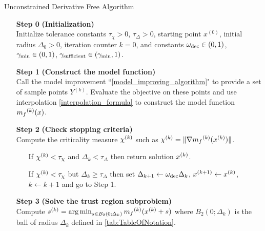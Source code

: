 \begin{algorithm}[H]
    \caption{Unconstrained Derivative Free Algorithm}
    \label{unconstrained_dfo}
    \begin{itemize}
        \item[\textbf{Step 0}] \textbf{(Initialization)} \\
            Initialize tolerance constants $\tau_{\chi} > 0$, $\tau_{\Delta} > 0$, starting point $x^{(0)}$, initial radius $\Delta_0 > 0$, iteration counter $k=0$, and constants $\omega_{\text{dec}} \in (0, 1)$, $ \gamma_{\text{min}} \in (0, 1)$, $\gamma_{\text{sufficient}} \in (\gamma_{\text{min}}, 1)$.
            
        \item[\textbf{Step 1}] \textbf{(Construct the model function)} \\
            Call the model improvement ``\cref{model_improving_algorithm}" to provide a set of sample points $Y^{(k)}$.
            Evaluate the objective on these points and use interpolation \cref{interpolation_formula} to construct the model function ${{m}_f}^{(k)}(x)$.
        
        \item[\textbf{Step 2}] \textbf{(Check stopping criteria)} \\
            Compute the criticality measure ${\chi^{(k)}}$ such as ${\chi^{(k)}} = \|\nabla{{m}_f}^{(k)}({x}^{(k)})\|$. \begin{itemize}
                \item[] If $ {\chi^{(k)}} < \tau_{\chi} $ and $\Delta_k<\tau_{\Delta}$ then return solution ${x}^{(k)}$.
                \item[] If $ {\chi^{(k)}} < \tau_{\chi} $ but $\Delta_k\ge\tau_{\Delta}$ then  
                set $\Delta_{k+1} \gets \omega_{\text{dec}}\Delta_{k}$, 
                $x^{(k+1)} \gets {x}^{(k)}$,
                $k \gets k+1$ and go to Step 1.
            \end{itemize}
        
        \item[\textbf{Step 3}] \textbf{(Solve the trust region subproblem)} \\
            Compute ${s}^{(k)} = \operatorname*{arg\,min}_{s\in B_2(0; \Delta_k)} {{m}_f}^{(k)} ({x}^{(k)} + s)$ where $B_2(0; \Delta_k)$ is the ball of radius $\Delta_k$ defined in \cref{tab:TableOfNotation}.
            

\end{itemize}
\end{algorithm}
